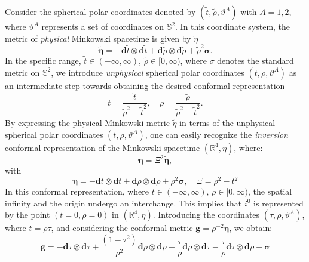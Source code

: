 Consider the spherical polar coordinates denoted by $(\tilde{t}, \tilde{\rho}, \vartheta^A)$ with $A = 1, 2$, where $\vartheta^A$ represents a set of coordinates on $\mathbb{S}^2$. In this coordinate system, the metric of \textit{physical} Minkowski spacetime is given by $\tilde{\eta}$
\begin{equation}\label{eq:physicalMikmetric}
\tilde{\boldsymbol{\eta}}=-\mathbf{d} \tilde{t} \otimes \mathbf{d} \tilde{t}+\mathbf{d} \tilde{\rho} \otimes \mathbf{d} \tilde{\rho}+\tilde{\rho}^2 \boldsymbol{\sigma}.
\end{equation}
In the specific range, $\tilde{t} \in (-\infty, \infty)$, $\tilde{\rho} \in [0, \infty)$, where $\sigma$ denotes the standard metric on $\mathbb{S}^2$, we introduce \textit{unphysical} spherical polar coordinates $(t, \rho, \vartheta^A)$ as an intermediate step towards obtaining the desired conformal representation
\begin{equation}\label{eq:unphysicalCoords}
t=\frac{\tilde{t}}{\tilde{\rho}^2-\tilde{t}^2}, \quad \rho=\frac{\tilde{\rho}}{\tilde{\rho}^2-\tilde{t}^2}.
\end{equation}
By expressing the physical Minkowski metric $\tilde{\eta}$ in terms of the unphysical spherical polar coordinates $(t, \rho, \vartheta^A)$, one can easily recognize the \textit{inversion} conformal representation of the Minkowski spacetime $(\mathbb{R}^4, \eta)$, where:
\begin{equation}\label{eq:metricRelation}
  \boldsymbol{\eta} = \Xi^2 \boldsymbol{\tilde{\eta}},
\end{equation}
with
\begin{equation}\label{eq:Unphysicalspacetimemetric}
  \boldsymbol{\eta}=-\mathbf{d} t \otimes \mathbf{d} t+\mathbf{d} \rho \otimes \mathbf{d} \rho+\rho^2 \boldsymbol{\sigma}, \quad \Xi=\rho^2-t^2
\end{equation}
In this conformal representation, where $t \in (-\infty, \infty)$, $\rho \in [0, \infty)$, the spatial infinity and the origin undergo an interchange. This implies that $i^0$ is represented by the point $(t = 0, \rho = 0)$ in $(\mathbb{R}^4, \eta)$. Introducing the coordinates $(\tau, \rho, \vartheta^A)$, where $t = \rho \tau$, and considering the conformal metric $\boldsymbol{g} = \rho^{-2} \boldsymbol{\eta}$, we obtain:
\begin{equation}\label{eq:unphysicalmetricMink}
\boldsymbol{g}=-\mathbf{d} \tau \otimes \mathbf{d} \tau+\frac{\left(1-\tau^2\right)}{\rho^2} \mathbf{d} \rho \otimes \mathbf{d} \rho-\frac{\tau}{\rho} \mathbf{d} \rho \otimes \mathbf{d} \tau-\frac{\tau}{\rho} \mathbf{d} \tau \otimes \mathbf{d} \rho+\boldsymbol{\sigma}
\end{equation}
